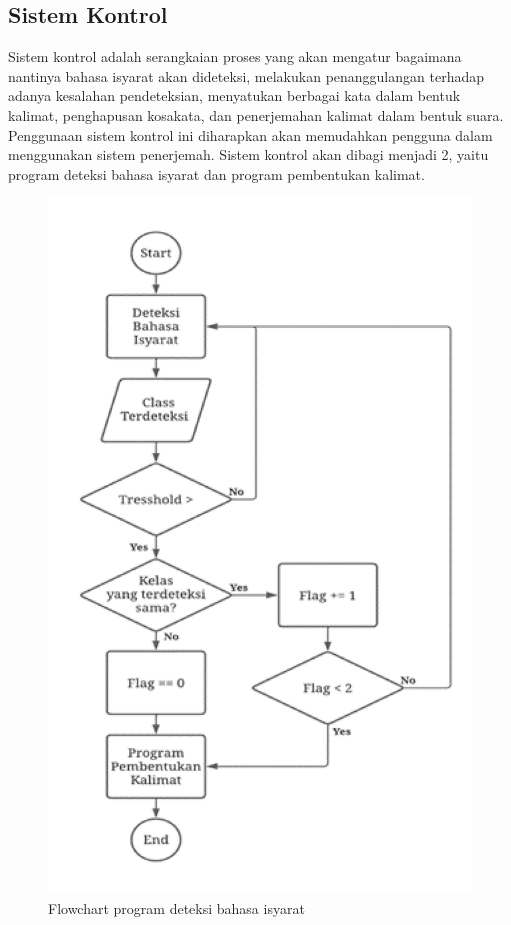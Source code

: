 \subsection{Sistem Kontrol}
\label{subsec:sisitemkontrol}
Sistem kontrol adalah serangkaian proses yang akan mengatur bagaimana nantinya bahasa isyarat akan dideteksi, melakukan penanggulangan terhadap adanya kesalahan pendeteksian, menyatukan berbagai kata dalam bentuk kalimat, penghapusan kosakata, dan penerjemahan kalimat dalam bentuk suara. Penggunaan sistem kontrol ini diharapkan akan memudahkan pengguna dalam menggunakan sistem penerjemah. Sistem kontrol akan dibagi menjadi 2, yaitu program deteksi bahasa isyarat dan program pembentukan kalimat.

\begin{figure}[H]
  \centering

  \includegraphics[scale=0.35]{gambar/bab3-flowchart-deteksi.png}

  \caption{Flowchart program deteksi bahasa isyarat}
  \label{fig:flowchartdeteksi}
\end{figure}

